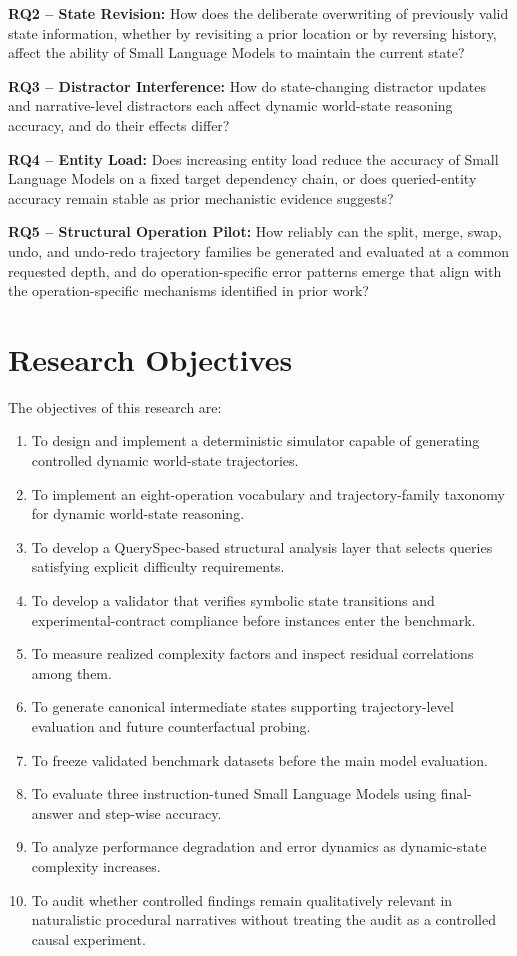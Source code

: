 \documentclass{iutbscthesis}
\begin{document}
\textbf{RQ2 -- State Revision:}
How does the deliberate overwriting of previously valid state information, whether by revisiting a
prior location or by reversing history, affect the ability of Small Language Models to maintain the
current state?

\textbf{RQ3 -- Distractor Interference:}
How do state-changing distractor updates and narrative-level distractors each affect dynamic
world-state reasoning accuracy, and do their effects differ?

\textbf{RQ4 -- Entity Load:}
Does increasing entity load reduce the accuracy of Small Language Models on a fixed target dependency
chain, or does queried-entity accuracy remain stable as prior mechanistic evidence suggests?

\textbf{RQ5 -- Structural Operation Pilot:}
How reliably can the split, merge, swap, undo, and undo-redo trajectory families be generated and
evaluated at a common requested depth, and do operation-specific error patterns emerge that align with
the operation-specific mechanisms identified in prior work?

\section{Research Objectives}
The objectives of this research are:
\begin{enumerate}
\item To design and implement a deterministic simulator capable of generating controlled dynamic
world-state trajectories.
\item To implement an eight-operation vocabulary and trajectory-family taxonomy for dynamic
world-state reasoning.
\item To develop a QuerySpec-based structural analysis layer that selects queries satisfying explicit
difficulty requirements.
\item To develop a validator that verifies symbolic state transitions and experimental-contract
compliance before instances enter the benchmark.
\item To measure realized complexity factors and inspect residual correlations among them.
\item To generate canonical intermediate states supporting trajectory-level evaluation and future
counterfactual probing.
\item To freeze validated benchmark datasets before the main model evaluation.
\item To evaluate three instruction-tuned Small Language Models using final-answer and step-wise accuracy.
\item To analyze performance degradation and error dynamics as dynamic-state complexity increases.
\item To audit whether controlled findings remain qualitatively relevant in naturalistic procedural
narratives without treating the audit as a controlled causal experiment.
\end{enumerate}
\end{document}
